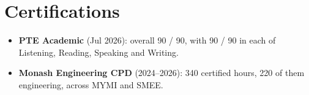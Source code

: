 \section*{Certifications}

\noindent
{\small
\begin{itemize}
    \item \textbf{PTE Academic} (Jul 2026): overall 90 / 90, with 90 / 90 in each of Listening, Reading, Speaking and Writing.
    \item \textbf{Monash Engineering CPD} (2024--2026): 340 certified hours, 220 of them engineering, across MYMI and SMEE.
\end{itemize}
\par}
